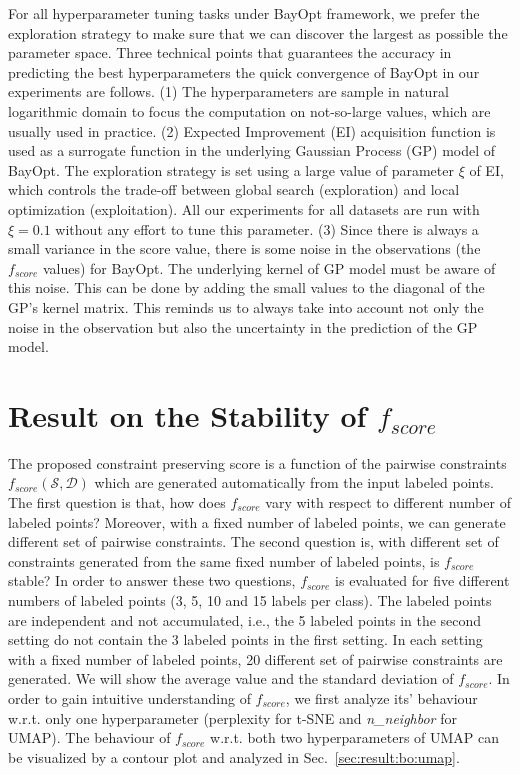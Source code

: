 For all hyperparameter tuning tasks under BayOpt framework, we prefer the exploration strategy to make sure that we can discover the largest as possible the parameter space.
Three technical points that guarantees the accuracy in predicting the best hyperparameters the quick convergence of BayOpt in our experiments are follows.
(1) The hyperparameters are sample in natural logarithmic domain to focus the computation on not-so-large values, which are usually used in practice.
(2) Expected Improvement (EI) acquisition function is used as a surrogate function in the underlying Gaussian Process (GP) model of BayOpt.
The exploration strategy is set using a large value of parameter $\xi$ of EI, which controls the trade-off between global search (exploration) and local optimization (exploitation).
All our experiments for all datasets are run with $\xi=0.1$ without any effort to tune this parameter.
(3) Since there is always a small variance in the score value, there is some noise in the observations (the $f_{score}$ values) for BayOpt.
The underlying kernel of GP model must be aware of this noise.
This can be done by adding the small values to the diagonal of the GP's kernel matrix.
This reminds us to always take into account not only the noise in the observation but also the uncertainty in the prediction of the GP model.

\section{Result on the Stability of $f_{score}$}\label{sec:result:stability}

The proposed constraint preserving score is a function of the pairwise constraints $f_{score}(\mathcal{S}, \mathcal{D})$ which are generated automatically from the input labeled points.
The first question is that, how does $f_{score}$ vary with respect to different number of labeled points?
Moreover, with a fixed number of labeled points, we can generate different set of pairwise constraints.
The second question is, with different set of constraints generated from the same fixed number of labeled points, is $f_{score}$ stable?
In order to answer these two questions, $f_{score}$ is evaluated for five different numbers of labeled points (3, 5, 10 and 15 labels per class).
The labeled points are independent and not accumulated, i.e., the 5 labeled points in the second setting do not contain the 3 labeled points in the first setting.
In each setting with a fixed number of labeled points, 20 different set of pairwise constraints are generated.
We will show the average value and the standard deviation of $f_{score}$.
In order to gain intuitive understanding of $f_{score}$, we first analyze its' behaviour w.r.t. only one hyperparameter (perplexity for t-SNE and \emph{n\_neighbor} for UMAP).
The behaviour of $f_{score}$ w.r.t. both two hyperparameters of UMAP can be visualized by a contour plot and analyzed in Sec.~\ref{sec:result:bo:umap}. %

